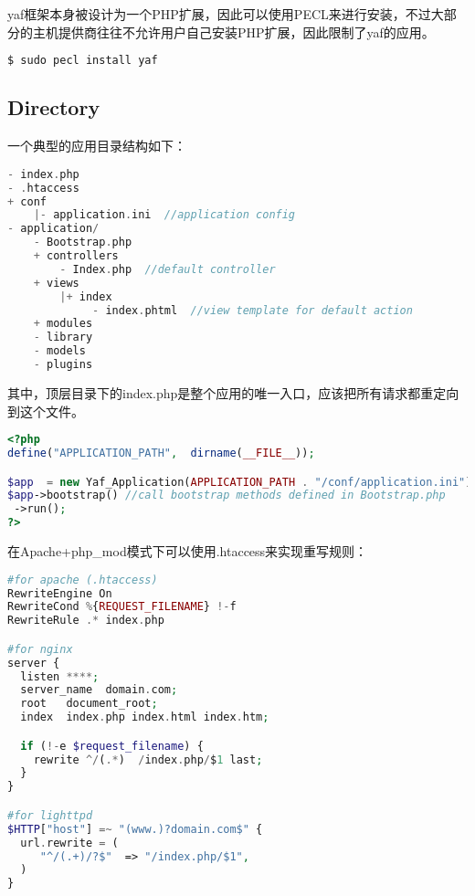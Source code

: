 yaf框架本身被设计为一个PHP扩展，因此可以使用PECL来进行安装，不过大部分的主机提供商往往不允许用户自己安装PHP扩展，因此限制了yaf的应用。

\begin{lstlisting}[language=PHP]
$ sudo pecl install yaf
\end{lstlisting}




\subsection{Directory}


一个典型的应用目录结构如下：

\begin{lstlisting}[language=PHP]
- index.php 
- .htaccess 
+ conf
    |- application.ini  //application config
- application/
    - Bootstrap.php   
    + controllers
        - Index.php  //default controller
    + views    
        |+ index   
             - index.phtml  //view template for default action
    + modules 
    - library
    - models  
    - plugins 
\end{lstlisting}

其中，顶层目录下的index.php是整个应用的唯一入口，应该把所有请求都重定向到这个文件。




\begin{lstlisting}[language=PHP]
<?php
define("APPLICATION_PATH",  dirname(__FILE__));

$app  = new Yaf_Application(APPLICATION_PATH . "/conf/application.ini");
$app->bootstrap() //call bootstrap methods defined in Bootstrap.php
 ->run();
?>
\end{lstlisting}





在Apache+php\_mod模式下可以使用.htaccess来实现重写规则：

\begin{lstlisting}[language=PHP]
#for apache (.htaccess)
RewriteEngine On
RewriteCond %{REQUEST_FILENAME} !-f
RewriteRule .* index.php

#for nginx
server {
  listen ****;
  server_name  domain.com;
  root   document_root;
  index  index.php index.html index.htm;

  if (!-e $request_filename) {
    rewrite ^/(.*)  /index.php/$1 last;
  }
}

#for lighttpd
$HTTP["host"] =~ "(www.)?domain.com$" {
  url.rewrite = (
     "^/(.+)/?$"  => "/index.php/$1",
  )
}
\end{lstlisting}




